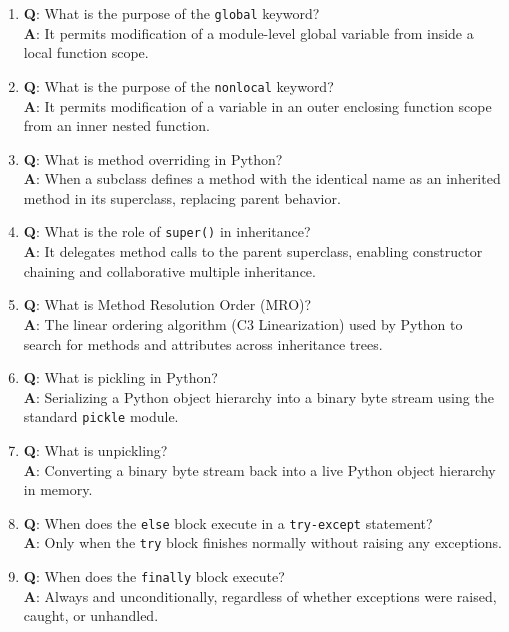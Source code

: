 \begin{enumerate}[leftmargin=1.5em]
    \item \textbf{Q}: What is the purpose of the \texttt{global} keyword?\\
    \textbf{A}: It permits modification of a module-level global variable from inside a local function scope.

    \item \textbf{Q}: What is the purpose of the \texttt{nonlocal} keyword?\\
    \textbf{A}: It permits modification of a variable in an outer enclosing function scope from an inner nested function.

    \item \textbf{Q}: What is method overriding in Python?\\
    \textbf{A}: When a subclass defines a method with the identical name as an inherited method in its superclass, replacing parent behavior.

    \item \textbf{Q}: What is the role of \texttt{super()} in inheritance?\\
    \textbf{A}: It delegates method calls to the parent superclass, enabling constructor chaining and collaborative multiple inheritance.

    \item \textbf{Q}: What is Method Resolution Order (MRO)?\\
    \textbf{A}: The linear ordering algorithm (C3 Linearization) used by Python to search for methods and attributes across inheritance trees.

    \item \textbf{Q}: What is pickling in Python?\\
    \textbf{A}: Serializing a Python object hierarchy into a binary byte stream using the standard \texttt{pickle} module.

    \item \textbf{Q}: What is unpickling?\\
    \textbf{A}: Converting a binary byte stream back into a live Python object hierarchy in memory.

    \item \textbf{Q}: When does the \texttt{else} block execute in a \texttt{try-except} statement?\\
    \textbf{A}: Only when the \texttt{try} block finishes normally without raising any exceptions.

    \item \textbf{Q}: When does the \texttt{finally} block execute?\\
    \textbf{A}: Always and unconditionally, regardless of whether exceptions were raised, caught, or unhandled.


\end{enumerate}
